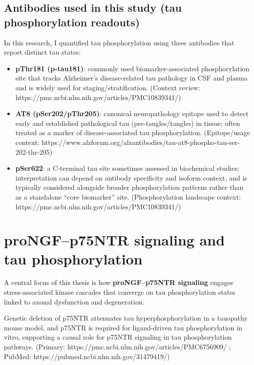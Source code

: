 \documentclass[
  letterpaper,
  DIV=11,
  numbers=noendperiod]{scrreprt}
\begin{document}
\subsection{Antibodies used in this study (tau phosphorylation
readouts)}\label{antibodies-used-in-this-study-tau-phosphorylation-readouts}

In this research, I quantified tau phosphorylation using three
antibodies that report distinct tau states:

\begin{itemize}
\item
  \textbf{pThr181 (p-tau181)}: commonly used biomarker-associated
  phosphorylation site that tracks Alzheimer's disease-related tau
  pathology in CSF and plasma and is widely used for
  staging/stratification. (Context review:
  https://pmc.ncbi.nlm.nih.gov/articles/PMC10839341/)
\item
  \textbf{AT8 (pSer202/pThr205)}: canonical neuropathology epitope used
  to detect early and established pathological tau (pre-tangles/tangles)
  in tissue; often treated as a marker of disease-associated tau
  phosphorylation. (Epitope/usage context:
  https://www.alzforum.org/alzantibodies/tau-at8-phospho-tau-ser-202-thr-205)
\item
  \textbf{pSer622}: a C-terminal tau site sometimes assessed in
  biochemical studies; interpretation can depend on antibody specificity
  and isoform context, and is typically considered alongside broader
  phosphorylation patterns rather than as a standalone ``core
  biomarker'' site. (Phosphorylation landscape context:
  https://pmc.ncbi.nlm.nih.gov/articles/PMC10839341/)
\end{itemize}

\section{proNGF--p75NTR signaling and tau
phosphorylation}\label{prongfp75ntr-signaling-and-tau-phosphorylation}

A central focus of this thesis is how \textbf{proNGF--p75NTR signaling}
engages stress-associated kinase cascades that converge on tau
phosphorylation states linked to axonal dysfunction and degeneration.

Genetic deletion of p75NTR attenuates tau hyperphosphorylation in a
tauopathy mouse model, and p75NTR is required for ligand-driven tau
phosphorylation in vitro, supporting a causal role for p75NTR signaling
in tau phosphorylation pathways. (Primary:
https://pmc.ncbi.nlm.nih.gov/articles/PMC6756909/ ; PubMed:
https://pubmed.ncbi.nlm.nih.gov/31479419/)
\end{document}
